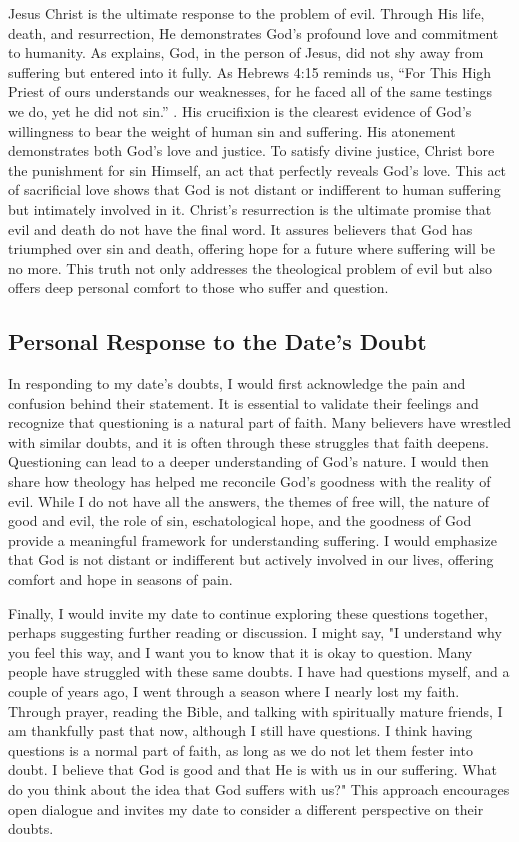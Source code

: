 \documentclass[stu,12pt,floatsintext]{apa7}
\begin{document}
Jesus Christ is the ultimate response to the problem of evil. Through His life, death, and resurrection, He demonstrates God's profound love and commitment to humanity. As \textcite[chapter 15]{ericksonIntroducingChristianDoctrine2015} explains, God, in the person of Jesus, did not shy away from suffering but entered into it fully. As Hebrews 4:15 reminds us, “For This High Priest of ours understands our weaknesses, for he faced all of the same testings we do, yet he did not sin.” \parencite{Tyndale1996}. His crucifixion is the clearest evidence of God's willingness to bear the weight of human sin and suffering. His atonement demonstrates both God's love and justice. To satisfy divine justice, Christ bore the punishment for sin Himself, an act that perfectly reveals God's love. This act of sacrificial love shows that God is not distant or indifferent to human suffering but intimately involved in it. Christ's resurrection is the ultimate promise that evil and death do not have the final word. It assures believers that God has triumphed over sin and death, offering hope for a future where suffering will be no more. This truth not only addresses the theological problem of evil but also offers deep personal comfort to those who suffer and question.

\subsection{Personal Response to the Date’s Doubt}

In responding to my date's doubts, I would first acknowledge the pain and confusion behind their statement. It is essential to validate their feelings and recognize that questioning is a natural part of faith. Many believers have wrestled with similar doubts, and it is often through these struggles that faith deepens. Questioning can lead to a deeper understanding of God's nature. I would then share how theology has helped me reconcile God's goodness with the reality of evil. While I do not have all the answers, the themes of free will, the nature of good and evil, the role of sin, eschatological hope, and the goodness of God provide a meaningful framework for understanding suffering. I would emphasize that God is not distant or indifferent but actively involved in our lives, offering comfort and hope in seasons of pain.

Finally, I would invite my date to continue exploring these questions together, perhaps suggesting further reading or discussion. I might say, "I understand why you feel this way, and I want you to know that it is okay to question. Many people have struggled with these same doubts. I have had questions myself, and a couple of years ago, I went through a season where I nearly lost my faith. Through prayer, reading the Bible, and talking with spiritually mature friends, I am thankfully past that now, although I still have questions. I think having questions is a normal part of faith, as long as we do not let them fester into doubt. I believe that God is good and that He is with us in our suffering. What do you think about the idea that God suffers with us?" This approach encourages open dialogue and invites my date to consider a different perspective on their doubts.
\end{document}
